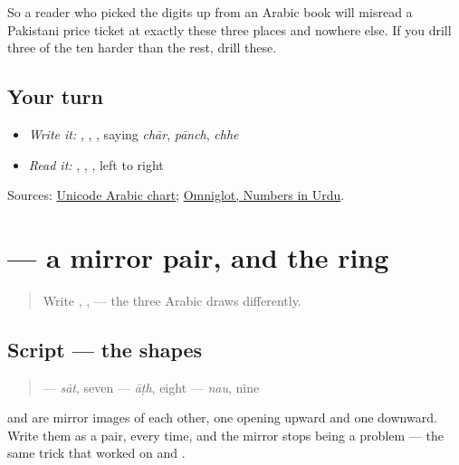 So a reader who picked the digits up from an Arabic book will misread a Pakistani price ticket at exactly these three places and nowhere else. If you drill three of the ten harder than the rest, drill these.

\subsection*{Your turn}
\begin{itemize}
\raggedright
  \item \emph{Write it:} \textbf{}, \textbf{}, \textbf{}, saying \emph{chār}, \emph{pānch}, \emph{chhe}
  \item \emph{Read it:} \textbf{}, \textbf{}, \textbf{}, left to right
\end{itemize}

\begin{tcolorbox}[breakable,colback=teal!4,colframe=teal!35!black,title={Before you move on}]
Sources: \href{https://www.unicode.org/charts/PDF/U0600.pdf}{Unicode Arabic chart}; \href{https://www.omniglot.com/language/numbers/urdu.htm}{Omniglot, Numbers in Urdu}.
\end{tcolorbox}
\section[\texorpdfstring{\ur{۷} \ur{۸} \ur{۹} (sāt āṭh nau)}{۷ ۸ ۹ (sāt āṭh nau)}]{   — a mirror pair, and the ring}

\label{lesson:UR-W31-digits-seven-eight-nine}



\begin{quote}
Write \textbf{}, \textbf{}, \textbf{} — the three Arabic draws differently.
\end{quote}

\subsection*{Script — the shapes}
\begin{quote}
\textbf{} — \emph{sāt}, seven  \textbf{} — \emph{āṭh}, eight  \textbf{} — \emph{nau}, nine
\end{quote}

\textbf{} and \textbf{} are mirror images of each other, one opening upward and one downward. Write them as a pair, every time, and the mirror stops being a problem — the same trick that worked on \textbf{} and \textbf{}.

